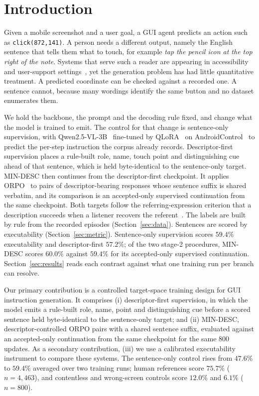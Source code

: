\documentclass[conference]{IEEEtran}
\begin{document}
\section{Introduction}

Given a mobile screenshot and a user goal, a GUI agent predicts an action such as
\texttt{click(872,141)}. A person needs a different output, namely the English sentence that
tells them what to touch, for example \emph{tap the pencil icon at the top right of the note}.
Systems that serve such a reader are appearing in accessibility and user-support
settings~\cite{guideme}, yet the generation problem has had little quantitative treatment. A
predicted coordinate can be checked against a recorded one. A sentence cannot, because many
wordings identify the same button and no dataset enumerates them.

We hold the backbone, the prompt and the decoding rule fixed, and change what the model is
trained to emit. The control for that change is sentence-only supervision, with
Qwen2.5-VL-3B~\cite{qwen25vl} fine-tuned by QLoRA~\cite{lora,qlora} on
AndroidControl~\cite{androidcontrol} to predict the per-step instruction the corpus already
records. Descriptor-first supervision places a rule-built role, name, touch point and
distinguishing cue ahead of that sentence, which is held byte-identical to the sentence-only
target. MIN-DESC then continues from the descriptor-first checkpoint. It applies
ORPO~\cite{orpo} to pairs of descriptor-bearing responses whose sentence suffix is shared
verbatim, and its comparison is an accepted-only supervised continuation from the same
checkpoint. Both targets follow the referring-expression criterion that a description succeeds
when a listener recovers the referent~\cite{mao2016,luo2017,yu2017}. The labels are built by
rule from the recorded episodes (Section~\ref{sec:data}). Sentences are scored by executability
(Section~\ref{sec:metric}). Sentence-only supervision scores $59.4\%$ executability and
descriptor-first $57.2\%$; of the two stage-2 procedures, MIN-DESC scores $60.0\%$ against
$59.4\%$ for its accepted-only supervised continuation. Section~\ref{sec:results} reads each
contrast against what one training run per branch can resolve.

Our primary contribution is a controlled target-space training design for GUI instruction
generation. It comprises (i) descriptor-first supervision, in which the model emits a
rule-built role, name, point and distinguishing cue before a scored sentence held
byte-identical to the sentence-only target; and (ii) MIN-DESC, descriptor-controlled ORPO
pairs with a shared sentence suffix, evaluated against an accepted-only continuation from
the same checkpoint for the same $800$ updates. As a secondary contribution, (iii) we use a
calibrated executability instrument to compare these systems. The sentence-only control
rises from $47.6\%$ to $59.4\%$ averaged over two training runs; human references score
$75.7\%$ ($n=4{,}463$), and contentless and wrong-screen controls score $12.0\%$ and $6.1\%$
($n=800$).
\end{document}
